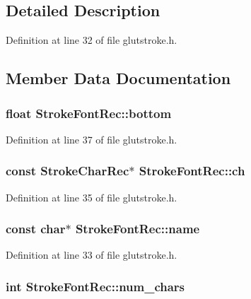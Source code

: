 \subsection{Detailed Description}


Definition at line 32 of file glutstroke.\-h.



\subsection{Member Data Documentation}
\hypertarget{struct_stroke_font_rec_a9a33680d3752e89196d184a930a809c3}{
\subsubsection[{bottom}]{\setlength{\rightskip}{0pt plus 5cm}float Stroke\-Font\-Rec\-::bottom}}\label{struct_stroke_font_rec_a9a33680d3752e89196d184a930a809c3}


Definition at line 37 of file glutstroke.\-h.

\hypertarget{struct_stroke_font_rec_a07946756718622d269df344616d77180}{
\subsubsection[{ch}]{\setlength{\rightskip}{0pt plus 5cm}const {\bf Stroke\-Char\-Rec}$\ast$ Stroke\-Font\-Rec\-::ch}}\label{struct_stroke_font_rec_a07946756718622d269df344616d77180}


Definition at line 35 of file glutstroke.\-h.

\hypertarget{struct_stroke_font_rec_a1fe6bcef9b9e4b7c7391ab657d9cd007}{
\subsubsection[{name}]{\setlength{\rightskip}{0pt plus 5cm}const char$\ast$ Stroke\-Font\-Rec\-::name}}\label{struct_stroke_font_rec_a1fe6bcef9b9e4b7c7391ab657d9cd007}


Definition at line 33 of file glutstroke.\-h.

\hypertarget{struct_stroke_font_rec_ab1fcdca4dff8f9ee75380be317b21d04}{
\subsubsection[{num\-\_\-chars}]{\setlength{\rightskip}{0pt plus 5cm}int Stroke\-Font\-Rec\-::num\-\_\-chars}}\label{struct_stroke_font_rec_ab1fcdca4dff8f9ee75380be317b21d04}


